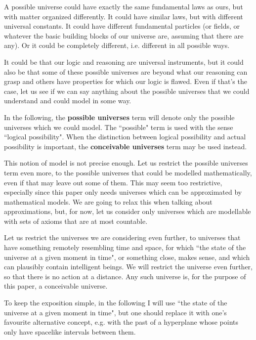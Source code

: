 \documentclass[a4paper
,draft
]{article}
\newcommand{\definitie}[1]{\textbf{#1}}
\newcommand{\ghilimele}[1]{``#1"}
\begin{document}
A possible universe
could have exactly the same fundamental laws as ours, but with matter
organized differently.
It could have similar laws, but with different universal constants.
It could have different fundamental particles (or fields, or whatever the basic
building blocks of our universe are, assuming that there are any).
Or it could be completely different, i.e. different in all possible ways.

It could be that our logic and reasoning are universal instruments,
but it could also be that some of these possible universes are
beyond what our reasoning can grasp and others have properties
for which our logic is flawed.
Even if that's the case, let us see if we can say anything about
the possible universes that we could understand and could model in some way.

In the following, the \definitie{possible universes} term will denote
only the possible universes which we could model.
The \ghilimele{possible} term is used with the sense
\ghilimele{logical possibility}. When the distinction between logical
possibility and actual possibility is important, the
\definitie{conceivable universes} term may be used instead.

This notion of model is not precise enough.
Let us restrict the possible universes term even more,
to the possible universes that could be modelled mathematically,
even if that may leave out some of them.
This may seem too restrictive,
especially since this paper only needs universes which can be approximated
by mathematical models.
We are going to relax this when talking about approximations, but, for now,
let us consider only universes
which are modellable with sets of axioms that are at most countable.

Let us restrict the universes we are considering even further, to universes that
have something remotely resembling time and space, for which
\ghilimele{the state of the universe at a given moment in time}, or something
close, makes sense, and which can plausibly contain intelligent beings. We
will restrict the universe even further, so that there is no action at a
distance.
Any such universe is, for the purpose of this paper, a conceivable universe.

To keep the exposition simple, in the following I will use
\ghilimele{the state of the universe at a given moment in time},
but one should replace it with one's favourite alternative concept, e.g.
with the past of a hyperplane whose points only have spacelike intervals between
them.
\end{document}

